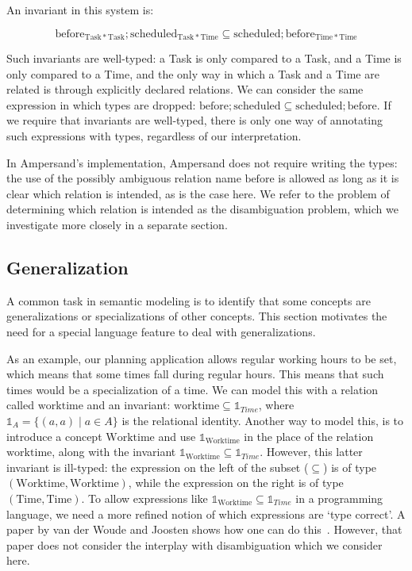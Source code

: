 \documentclass[12pt]{article}
\begin{document}
An invariant in this system is:

\[
\mathrm{before}_{\mathrm{Task * Task}};\mathrm{scheduled}_{\mathrm{Task * Time}} \subseteq \mathrm{scheduled};\mathrm{before}_{\mathrm{Time * Time}}
\]

Such invariants are well-typed: a Task is only compared to a Task, and a Time is only compared to a Time, and the only way in which a Task and a Time are related is through explicitly declared relations.
We can consider the same expression in which types are dropped: $\mathrm{before};\mathrm{scheduled} \subseteq \mathrm{scheduled};\mathrm{before}$.
If we require that invariants are well-typed, there is only one way of annotating such expressions with types, regardless of our interpretation.

In Ampersand's implementation, Ampersand does not require writing the types: the use of the possibly ambiguous relation name $\mathrm{before}$ is allowed as long as it is clear which relation is intended, as is the case here.
We refer to the problem of determining which relation is intended as the disambiguation problem, which we investigate more closely in a separate section.

\subsection{Generalization}
A common task in semantic modeling is to identify that some concepts are generalizations or specializations of other concepts.
This section motivates the need for a special language feature to deal with generalizations.

As an example, our planning application allows regular working hours to be set, which means that some times fall during regular hours.
This means that such times would be a specialization of a time.
We can model this with a relation called $\mathrm{worktime}$ and an invariant: $\mathrm{worktime} \subseteq \mathbb{1}_{Time}$, where $\mathbb{1}_{A} = \{(a,a) \mid a\in A \}$ is the relational identity.
Another way to model this, is to introduce a concept $\mathrm{Worktime}$ and use $\mathbb{1}_\mathrm{Worktime}$ in the place of the relation $\mathrm{worktime}$, along with the invariant $\mathbb{1}_\mathrm{Worktime} \subseteq \mathbb{1}_{Time}$.
However, this latter invariant is ill-typed: the expression on the left of the subset ($\subseteq$) is of type $(\mathrm{Worktime},\mathrm{Worktime})$, while the expression on the right is of type $(\mathrm{Time},\mathrm{Time})$.
To allow expressions like $\mathbb{1}_\mathrm{Worktime} \subseteq \mathbb{1}_{Time}$ in a programming language, we need a more refined notion of which expressions are `type correct'.
A paper by van der Woude and Joosten shows how one can do this~\cite{Woude11}.
However, that paper does not consider the interplay with disambiguation which we consider here.
\end{document}
